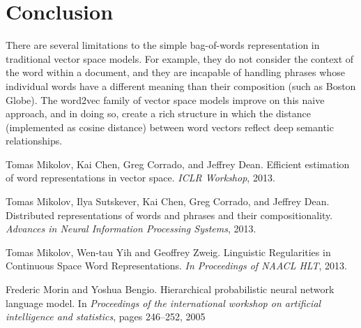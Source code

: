 \documentclass[12pt]{article}
\begin{document}
\section{Conclusion}

There are several limitations to the simple bag-of-words representation in traditional vector space models. For example, they do not consider the context of the word within a document, and they are incapable of handling  phrases whose individual words have a different meaning than their composition (such as Boston Globe). The word2vec family of vector space models improve on this naive approach, and in doing so, create a rich structure in which the distance (implemented as cosine distance) between word vectors reflect deep semantic relationships.


\begin{thebibliography}{10}

 Tomas Mikolov, Kai Chen, Greg Corrado, and Jeffrey Dean. Efficient estimation of word representations in vector space. \emph{ICLR Workshop}, 2013.

 Tomas Mikolov, Ilya Sutskever, Kai Chen, Greg Corrado, and Jeffrey Dean. Distributed representations of words and phrases and their compositionality. \emph{Advances in Neural Information Processing Systems}, 2013. 

Tomas Mikolov, Wen-tau Yih and Geoffrey Zweig.  Linguistic Regularities in Continuous Space Word Representations.  \emph{In Proceedings of NAACL HLT}, 2013.

Frederic Morin and Yoshua Bengio.  Hierarchical probabilistic neural network language model.  In \emph{Proceedings of the international workshop on artificial intelligence and statistics}, pages 246–252, 2005

\end{thebibliography} 
\end{document}
